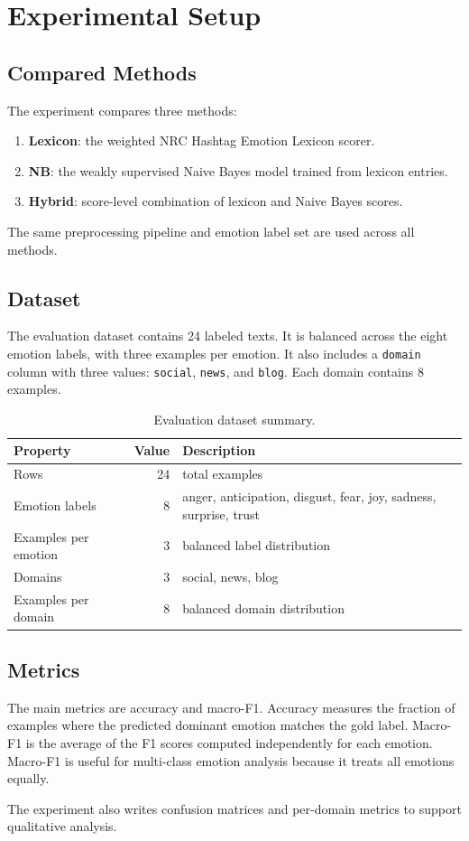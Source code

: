 \section{Experimental Setup}

\subsection{Compared Methods}

The experiment compares three methods:

\begin{enumerate}
    \item \textbf{Lexicon}: the weighted NRC Hashtag Emotion Lexicon scorer.
    \item \textbf{NB}: the weakly supervised Naive Bayes model trained from lexicon entries.
    \item \textbf{Hybrid}: score-level combination of lexicon and Naive Bayes scores.
\end{enumerate}

The same preprocessing pipeline and emotion label set are used across all methods.

\subsection{Dataset}

The evaluation dataset contains 24 labeled texts. It is balanced across the eight emotion labels, with three examples per emotion. It also includes a \texttt{domain} column with three values: \texttt{social}, \texttt{news}, and \texttt{blog}. Each domain contains 8 examples.

\begin{table}[h]
\centering
\small
\begin{tabular}{lrl}
\toprule
\textbf{Property} & \textbf{Value} & \textbf{Description} \\
\midrule
Rows & 24 & total examples \\
Emotion labels & 8 & anger, anticipation, disgust, fear, joy, sadness, surprise, trust \\
Examples per emotion & 3 & balanced label distribution \\
Domains & 3 & social, news, blog \\
Examples per domain & 8 & balanced domain distribution \\
\bottomrule
\end{tabular}
\caption{Evaluation dataset summary.}
\label{tab:dataset}
\end{table}

\subsection{Metrics}

The main metrics are accuracy and macro-F1. Accuracy measures the fraction of examples where the predicted dominant emotion matches the gold label. Macro-F1 is the average of the F1 scores computed independently for each emotion. Macro-F1 is useful for multi-class emotion analysis because it treats all emotions equally.

The experiment also writes confusion matrices and per-domain metrics to support qualitative analysis.
